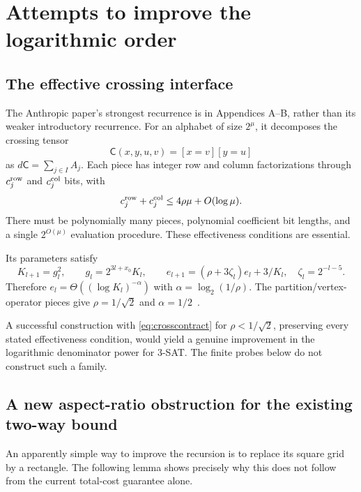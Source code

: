 \section{Attempts to improve the logarithmic order}
\label{sec:barriers}

\subsection{The effective crossing interface}

The Anthropic paper's strongest recurrence is in Appendices A--B, rather
than its weaker introductory recurrence. For an alphabet of size
$2^\mu$, it decomposes the crossing tensor
\[
 \mathsf C(x,y,u,v)=[x=v][y=u]
\]
as $d\mathsf C=\sum_{j\in I}A_j$. Each piece has integer row and column
factorizations through $c_j^{\rm row}$ and $c_j^{\rm col}$ bits, with
\begin{equation}\label{eq:crosscontract}
 c_j^{\rm row}+c_j^{\rm col}
 \le4\rho\mu+O(\log\mu).
\end{equation}
There must be polynomially many pieces, polynomial coefficient bit
lengths, and a single $2^{O(\mu)}$ evaluation procedure. These effectiveness
conditions are essential.

Its parameters satisfy
\[
 K_{l+1}=g_l^2,\qquad
 g_l=2^{3l+x_0}K_l,\qquad
 e_{l+1}=(\rho+3\zeta_l)e_l+3/K_l,
 \quad\zeta_l=2^{-l-5}.
\]
Therefore $e_l=\Theta((\log K_l)^{-\alpha})$ with
$\alpha=\log_2(1/\rho)$. The partition/vertex-operator pieces give
$\rho=1/\sqrt2$ and $\alpha=1/2$~\cite{anthropicpaper}.

A successful construction with \eqref{eq:crosscontract} for
$\rho<1/\sqrt2$, preserving every stated effectiveness condition,
would yield a genuine improvement in the logarithmic denominator power
for 3-SAT. The finite probes below do not construct such a family.

\subsection{A new aspect-ratio obstruction for the existing two-way bound}

An apparently simple way to improve the recursion is to replace its square
grid by a rectangle. The following lemma shows precisely why this does
not follow from the current total-cost guarantee alone.

